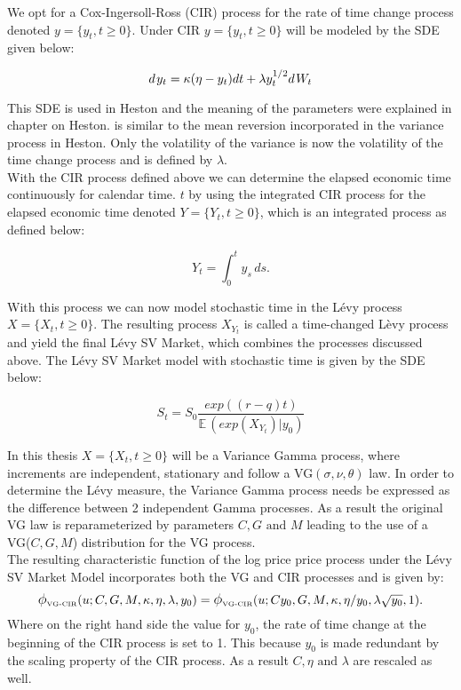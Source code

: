 We opt for a Cox-Ingersoll-Ross (CIR) process for the rate of time change process denoted $y=\{y_{t}, t \geq0 \}$. Under CIR $y=\{y_{t}, t \geq0 \}$ will be modeled by the SDE given below:

$$d \hspace{0.1em} y_{t}=\kappa(\eta - y_{t})dt + \lambda y_{t}^{1/2} d\hspace{0.1em} W_{t}$$

This SDE is used in Heston and the meaning of the parameters were explained in chapter on Heston. is similar to the mean reversion incorporated in the variance process in Heston. Only the volatility of the variance is now the volatility of the time change process and is defined by $\lambda$.\\

With the CIR process defined above we can determine the elapsed economic time continuously for calendar time. $t$ by using the integrated CIR process for the elapsed economic time denoted $Y = \{Y_{t},t\geq0\}$, which is an integrated process as defined below:

$$Y_{t}= \int_{0}^{t}y_{s}\, ds .$$

With this process we can now model stochastic time in the Lévy process $X = \{X_{t},t\geq0\}$. The resulting process $X_{Y_{t}}$ is called a time-changed Lèvy process and yield the final Lévy SV Market, which combines the processes discussed above. The Lévy SV Market model with stochastic time is given by the SDE below:

$$S_{t}=S_{0} \frac{exp((r-q)t)}{\mathbb{E}\,(exp(X_{Y_{t}})|y_{0})} $$

In this thesis $X = \{X_{t},t\geq0\}$ will be a Variance Gamma process, where increments are independent, stationary and follow a VG$(\sigma,\nu,\theta)$ law. In order to determine the Lévy measure, the Variance Gamma process needs be expressed as the difference between 2 independent Gamma processes. As a result the original VG law is reparameterized by parameters $C, G \text{ and } M$ leading to the use of a VG($C,G,M$) distribution for the VG process. \\

The resulting characteristic function of the log price price process under the Lévy SV Market Model incorporates both the VG and CIR processes and is given by:
$$\text{\large $\phi_{\text{\tiny VG-CIR}}$}(u;C,G,M,\kappa,\eta,\lambda,y_{0})=\text{\large $\phi_{\text{\tiny VG-CIR}}$}(u;C y_{0},G,M,\kappa,\eta/y_{0},\lambda\sqrt{y_{0}},1) .$$
Where on the right hand side the value for $y_{0}$, the rate of time change at the beginning of the CIR process is set to 1. This because $y_{0}$ is made redundant by the scaling property of the CIR process. As a result $C, \eta \text{ and } \lambda$ are rescaled as well.\\
